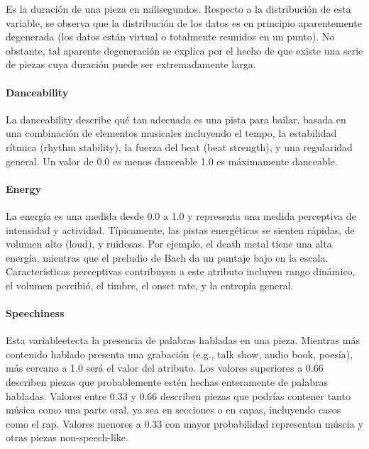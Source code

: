 \documentclass[
  letterpaper,
  DIV=11,
  numbers=noendperiod]{scrartcl}
\let\oldparagraph\paragraph
\renewcommand{\paragraph}[1]{\oldparagraph{#1}\mbox{}}
\begin{document}
Es la duración de una pieza en milisegundos. Respecto a la distribución
de esta variable, se observa que la distribución de los datos es en
principio aparentemente degenerada (los datos están virtual o totalmente
reunidos en un punto). No obstante, tal aparente degeneración se explica
por el hecho de que existe una serie de piezas cuya duración puede ser
extremadamente larga.

\hypertarget{danceability}{%
\paragraph{Danceability}\label{danceability}}

La danceability describe qué tan adecuada es una pista para bailar,
basada en una combinación de elementos musicales incluyendo el tempo, la
estabilidad rítmica (rhythm stability), la fuerza del beat (beat
strength), y una regularidad general. Un valor de 0.0 es menos danceable
1.0 es máximamente danceable.

\hypertarget{energy}{%
\paragraph{Energy}\label{energy}}

La energía es una medida desde 0.0 a 1.0 y representa una medida
perceptiva de intensidad y actividad. Típicamente, las pistas
energéticas se sienten rápidas, de volumen alto (loud), y ruidosas. Por
ejemplo, el death metal tiene una alta energía, mientras que el preludio
de Bach da un puntaje bajo en la escala. Características perceptivas
contribuyen a este atributo incluyen rango dinámico, el volumen
percibió, el timbre, el onset rate, y la entropía general.

\hypertarget{speechiness}{%
\paragraph{Speechiness}\label{speechiness}}

Esta variableetecta la presencia de palabras habladas en una pieza.
Mientras más contenido hablado presenta una grabación (e.g., talk show,
audio book, poesía), más cercano a 1.0 será el valor del atributo. Los
valores superiores a 0.66 describen piezas que probablemente estén
hechas enteramente de palabras habladas. Valores entre 0.33 y 0.66
describen piezas que podrías contener tanto música como una parte oral,
ya sea en secciones o en capas, incluyendo casos como el rap. Valores
menores a 0.33 con mayor probabilidad representan múscia y otras piezas
non-speech-like.
\end{document}
